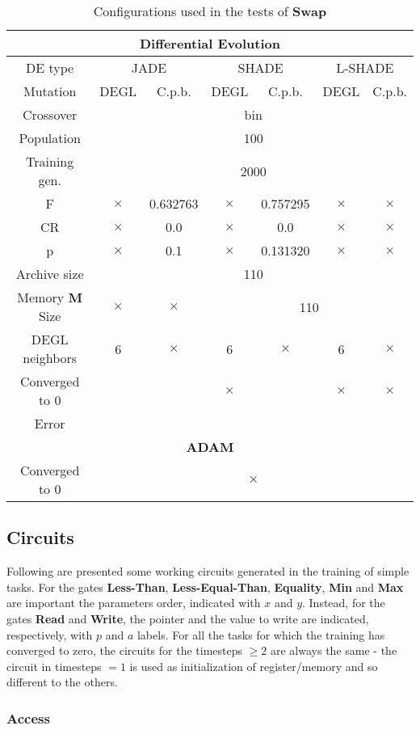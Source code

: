 \begin{table}[!h]
\begin{tabular}{|c|c|c|c|c|c|c|}
		\multicolumn{7}{|c|}{\textbf{Differential Evolution}} \\ \hline
		DE type & \multicolumn{2}{c|}{JADE} & \multicolumn{2}{c|}{SHADE} & \multicolumn{2}{c|}{L-SHADE}  \\ \hline
		Mutation & DEGL & C.p.b. & DEGL & C.p.b. & DEGL & C.p.b. \\ \hline
		Crossover & \multicolumn{6}{c|}{bin} \\ \hline
		Population & \multicolumn{6}{c|}{100} \\ \hline
		Training gen. & \multicolumn{6}{c|}{2000} \\ \hline
		F & $\times$ & 0.632763 & $\times$ & 0.757295 & $\times$ & $\times$ \\ \hline
		CR & $\times$ & 0.0 & $\times$ & 0.0 & $\times$ & $\times$ \\ \hline
		p & $\times$ & 0.1 & $\times$ & 0.131320 & $\times$ & $\times$ \\ \hline
		Archive size & \multicolumn{6}{c|}{110} \\ \hline
		Memory \textbf{M} Size & $\times$ & $\times$ & \multicolumn{4}{c|}{110} \\ \hline
		DEGL neighbors & 6 & $\times$ & 6 & $\times$ & 6 & $\times$  \\ \hline
		Converged to 0 & \checkmark & \checkmark & $\times$ & \checkmark & $\times$ & $\times$ \\ \hline
		Error & & & & & & \\ \hline\hline
		
		\multicolumn{7}{|c|}{\textbf{ADAM}} \\ \hline
		Converged to 0 & \multicolumn{6}{|c|}{$\times$} \\ \hline
 	\end{tabular}
	\caption{Configurations used in the tests of \textbf{Swap}}
	\label{tbl:tests-configurations-swap}
\end{table}

\subsection{Circuits}\label{subsec:circuits}
Following are presented some working circuits generated in the training of simple tasks. For the gates \textbf{Less-Than}, \textbf{Less-Equal-Than}, \textbf{Equality}, \textbf{Min} and \textbf{Max} are important the parameters order, indicated with $x$ and $y$. Instead, for the gates \textbf{Read} and \textbf{Write}, the pointer and the value to write are indicated, respectively, with $p$ and $a$ labels.\newline\newline
For all the tasks for which the training has converged to zero, the circuits for the timesteps $\geq 2$ are always the same - the circuit in timesteps $=1$ is used as initialization of register/memory and so different to the others.

\subsubsection{Access}
